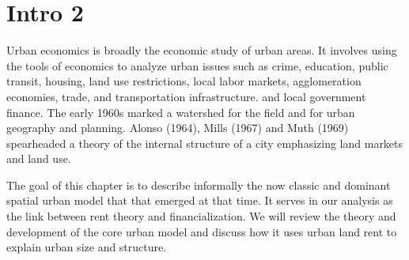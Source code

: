 




\section{Intro 2}

Urban economics is broadly the economic study of urban areas. It involves using the tools of economics to analyze urban issues such as crime, education, public transit, housing, land use restrictions, local labor markets, agglomeration economies, trade, and transportation infrastructure. and local government finance. The early 1960s marked a watershed for the field and for urban geography and planning.  Alonso (1964), Mills (1967) and Muth (1969) spearheaded a theory of the internal structure of a city emphasizing land markets and land use. 

The goal of this chapter is to describe informally the now classic and dominant spatial urban model that that emerged at that time. It serves in our analysis as the link between rent theory and financialization. %
We will review the theory and development of the core urban model and discuss how it uses urban land rent to explain urban size and structure. %

